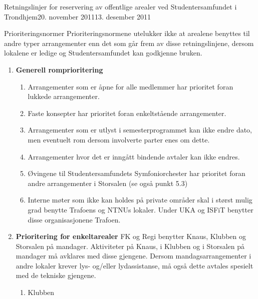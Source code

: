 \documentclass[fsbok.tex]{subfiles}
\begin{document}
\begin{instruks}{Retningslinjer for reservering av offentlige arealer
    ved Studentersamfundet i Trondhjem}{20. november 2011}{13. desember 2011}
    \begin{instruksledd}{Prioriteringsnormer}
        Prioriteringsnormene utelukker ikke at arealene benyttes til andre typer
        arrangementer enn det som går frem av disse
        retningslinjene, dersom lokalene er ledige og Studentersamfundet kan godkjenne
        bruken.
        \begin{enumerate}
            \item \textbf{Generell romprioritering}
                \begin{enumerate}
                    \item Arrangementer som er åpne for alle medlemmer har prioritet
                        foran lukkede arrangementer.
                    \item Faste konsepter har prioritet foran enkeltstående
                        arrangementer.
                    \item Arrangementer som er utlyst i semesterprogrammet kan ikke
                        endre dato, men eventuelt rom dersom
                        involverte parter enes om dette.
                    \item Arrangementer hvor det er inngått bindende avtaler kan ikke
                        endres.
                    \item Øvingene til Studentersamfundets Symfoniorchester har
                        prioritet foran andre arrangementer i Storsalen (se
                        også punkt 5.3)
                    \item Interne møter som ikke kan holdes på private områder skal i
                        størst mulig grad benytte Trafoens og NTNUs
                        lokaler. Under UKA og ISFiT benytter disse organisasjonene
                        Trafoen.
                \end{enumerate}
            \item \textbf{ Prioritering for enkeltarealer}
                FK og Regi benytter Knaus, Klubben og Storsalen på mandager.
                Aktiviteter på Knaus, i Klubben og i Storsalen på
                mandager må avklares med disse gjengene. Dersom mandagsarrangementer i
                andre lokaler krever lys- og/eller
                lydassistanse, må også dette avtales spesielt med de tekniske
                gjengene.
                \begin{enumerate}
                    \item Klubben
                        \begin{enumerate}

\end{enumerate}
\end{enumerate}
\end{enumerate}
\end{instruksledd}
\end{instruks}
\end{document}
